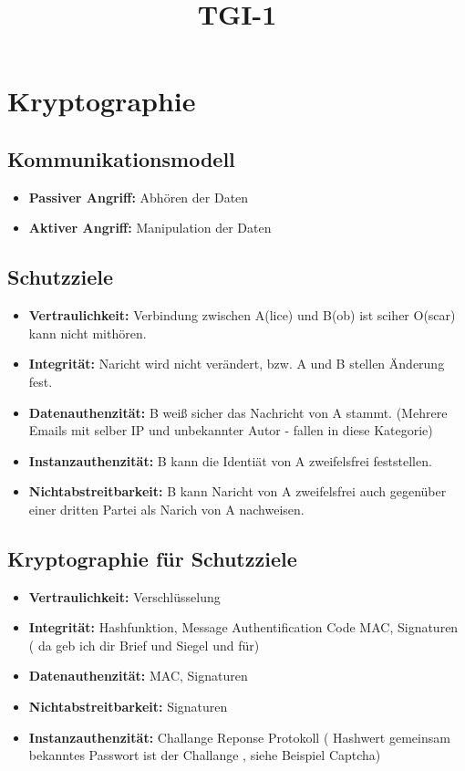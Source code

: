 \documentclass[a4paper,10pt]{scrartcl}
\title{TGI-1}
\author{}
\begin{document}
\section{Kryptographie}

\subsection{Kommunikationsmodell}

\begin{itemize}
 \item \textbf{Passiver Angriff:} Abhören der Daten 
 \item \textbf{Aktiver Angriff:} Manipulation der Daten
\end{itemize}

\subsection{Schutzziele}

\begin{itemize}
 \item \textbf{Vertraulichkeit:} Verbindung zwischen A(lice) und B(ob) ist sciher O(scar) kann nicht mithören. 
 \item \textbf{Integrität:} Naricht wird nicht verändert, bzw. A und B stellen Änderung fest.
 \item \textbf{Datenauthenzität: } B weiß sicher das Nachricht von A stammt. (Mehrere Emails mit selber IP und unbekannter Autor - 
 fallen in diese Kategorie)
 \item \textbf{Instanzauthenzität: } B kann die Identiät von A zweifelsfrei feststellen.
 \item \textbf{Nichtabstreitbarkeit: } B kann Naricht von A zweifelsfrei auch gegenüber einer dritten Partei als Narich von A 
 nachweisen.
 
 
\end{itemize}
 
 \subsection{Kryptographie für Schutzziele}
 
 \begin{itemize}
 \item \textbf{Vertraulichkeit:} Verschlüsselung 
 \item \textbf{Integrität:} Hashfunktion, Message Authentification Code MAC, Signaturen ( da geb ich dir Brief und Siegel und für)
 \item \textbf{Datenauthenzität: } MAC, Signaturen
 \item \textbf{Nichtabstreitbarkeit: } Signaturen
 \item \textbf{Instanzauthenzität: } Challange Reponse Protokoll ( Hashwert gemeinsam bekanntes Passwort ist der Challange , siehe Beispiel 
 Captcha)
 
\end{itemize}
\end{document}
